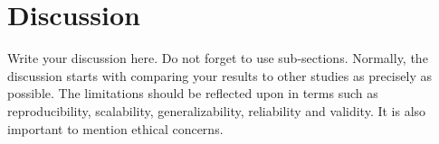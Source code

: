 \section{Discussion}
\label{sec:discussion}
Write your discussion here. Do not forget to use sub-sections. Normally, the discussion starts with comparing your results to other studies as precisely as possible. The limitations should be reflected upon in terms such as reproducibility,  scalability,  generalizability,  reliability  and  validity. It is also important to mention ethical concerns.